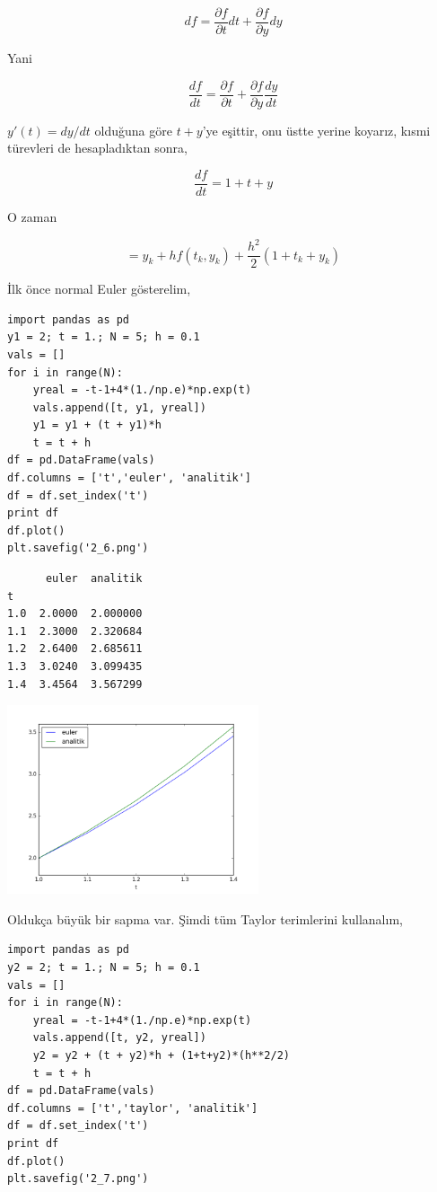 \documentclass[12pt,fleqn]{article}\usepackage{../../common}
\begin{document}
$$ 
df = \frac{\partial f}{\partial t} dt + \frac{\partial f}{\partial y} dy
$$

Yani

$$ 
\frac{df}{dt} = \frac{\partial f}{\partial t} + 
\frac{\partial f}{\partial y} \frac{dy}{dt} 
$$

$y'(t)=dy/dt$ olduğuna göre $t + y$'ye eşittir, onu üstte yerine koyarız,
kısmi türevleri de hesapladıktan sonra,

$$ 
\frac{df}{dt} =  1 + t + y
$$

O zaman 

$$  = y_k + hf(t_k,y_k) + \frac{h^2}{2} (1 + t_k + y_k) $$

İlk önce normal Euler gösterelim,

\begin{verbatim}
import pandas as pd
y1 = 2; t = 1.; N = 5; h = 0.1
vals = []
for i in range(N): 
    yreal = -t-1+4*(1./np.e)*np.exp(t)
    vals.append([t, y1, yreal])
    y1 = y1 + (t + y1)*h
    t = t + h
df = pd.DataFrame(vals)
df.columns = ['t','euler', 'analitik']
df = df.set_index('t')
print df
df.plot()
plt.savefig('2_6.png')
\end{verbatim}

\begin{verbatim}
      euler  analitik
t                    
1.0  2.0000  2.000000
1.1  2.3000  2.320684
1.2  2.6400  2.685611
1.3  3.0240  3.099435
1.4  3.4564  3.567299
\end{verbatim}

\includegraphics[width=20em]{2_6.png}

Oldukça büyük bir sapma var. Şimdi tüm Taylor terimlerini kullanalım,

\begin{verbatim}
import pandas as pd
y2 = 2; t = 1.; N = 5; h = 0.1
vals = []
for i in range(N): 
    yreal = -t-1+4*(1./np.e)*np.exp(t)
    vals.append([t, y2, yreal])
    y2 = y2 + (t + y2)*h + (1+t+y2)*(h**2/2)
    t = t + h
df = pd.DataFrame(vals)
df.columns = ['t','taylor', 'analitik']
df = df.set_index('t')
print df
df.plot()
plt.savefig('2_7.png')
\end{verbatim}
\end{document}

